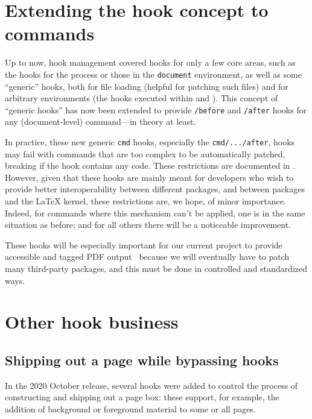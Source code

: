 \documentclass{ltnews}
\providecommand\Dash {\unskip ---}
\providecommand\hook[1]{\texttt{#1}}
\providecommand\env[1]{\texttt{#1}}
\providecommand\env[1]{\texttt{#1}}
\begin{document}
\section{Extending the hook concept to commands}

Up to now, hook management covered hooks for only a few core areas,
such as the hooks for the  process or those in the
\env{document} environment, as well as some \enquote {generic} hooks,
both for file loading (helpful for patching such files) and for
arbitrary environments (the hooks executed within  and
).  This concept of \enquote{generic hooks} has now been
extended to provide \hook{/before} and \hook{/after} hooks for any
(document-level) command\Dash in theory at least.


In practice, these new generic \hook{cmd} hooks, especially the
\hook{cmd/.../after}, hooks may fail with commands that are too
complex to be automatically patched, breaking if the hook contains any
code.  These restrictions are documented in
.
%   
However, given that these hooks are mainly meant for developers who
wish to provide better interoperability between different packages,
and between packages and the \LaTeX{} kernel, these restrictions are,
we hope, of minor importance.  Indeed, for commands where this
mechanism can't be applied, one is in the same situation as before;
and for all others there will be a noticeable improvement.

These hooks will be especially important for our current project to
provide accessible and tagged PDF output~\cite{33:blueprint} because
we will eventually have to patch many third-party packages, and this
must be done in controlled and standardized ways.




\section{Other hook business}


\subsection{Shipping out a page while bypassing hooks}

In the 2020 October release, several hooks were added to control the
process of constructing and shipping out a page box: these support,
for example, the addition of background or foreground material 
to some or all pages.
\end{document}
